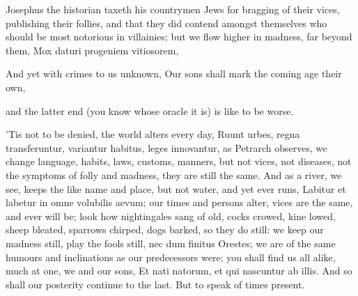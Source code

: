 {Josephus the historian taxeth his countrymen Jews for bragging of
their vices, publishing their follies, and that they did contend
amongst themselves who should be most notorious in villainies; but we
flow higher in madness, far beyond them,
Mox daturi progeniem vitiosorem,

And yet with crimes to us unknown,
Our sons shall mark the coming age their own,

and the latter end (you know whose oracle it is) is like to be worse.

'Tis not to be denied, the world alters every day, Ruunt urbes, regna
transferuntur, \etc{} variantur habitus, leges innovantur, as
Petrarch observes, we change language, habits, laws, customs,
manners, but not vices, not diseases, not the symptoms of folly and
madness, they are still the same. And as a river, we see, keeps the
like name and place, but not water, and yet ever runs, Labitur et
labetur in omne volubilis aevum; our times and persons alter, vices are
the same, and ever will be; look how nightingales sang of old, cocks
crowed, kine lowed, sheep bleated, sparrows chirped, dogs barked, so
they do still: we keep our madness still, play the fools still, nec dum
finitus Orestes; we are of the same humours and inclinations as our
predecessors were; you shall find us all alike, much at one, we and our
sons, Et nati natorum, et qui nascuntur ab illis. And so shall our
posterity continue to the last. But to speak of times present.

}
